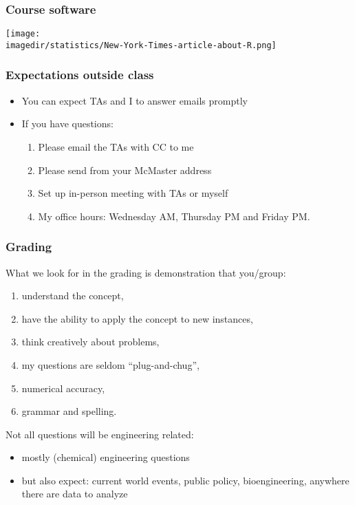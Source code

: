 \begin{frame}\frametitle{Course software}	
	\texttt{[image: \\imagedir/statistics/New-York-Times-article-about-R.png]}
\end{frame}

\begin{frame}\frametitle{Expectations outside class}
	\begin{itemize}
		\item	You can expect TAs and I to answer emails promptly 
		\item	If you have questions: 
		\begin{enumerate}
			\item	Please email the TAs with CC to me \hfill {\tiny{\color{myOrange}{$\longleftarrow$ hopefully this solves your problem}}}
			\item	Please send from your McMaster address
			\item	Set up in-person meeting with TAs or myself 
			\item	My office hours: Wednesday AM, Thursday PM and Friday PM.
		\end{enumerate}
	\end{itemize}
\end{frame}

\begin{frame}\frametitle{Grading}	
	What we look for in the grading is demonstration that you/group: 
	\begin{enumerate}
		\item	understand the concept, 
		\item	have the ability to apply the concept to new instances, 
		\item	think creatively about problems, 
		\item	my questions are seldom ``plug-and-chug'',
		\item	numerical accuracy, 
		\item	grammar and spelling.
	\end{enumerate}
	
	\vspace{12pt}
	Not all questions will be engineering related: 
	\begin{itemize}
		\item	mostly (chemical) engineering questions 
		\item	but also expect: current world events, public policy, bioengineering, anywhere there are data to analyze 
	\end{itemize}
\end{frame}

